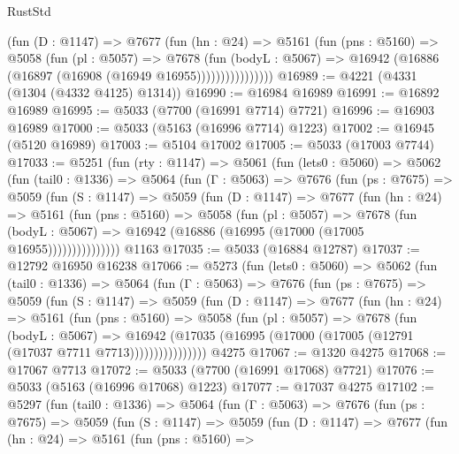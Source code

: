 \begin{lexlean}{RustStd}
\begin{coremodule}
                  (fun (D : @1147) =>
                  @7677
                    (fun (hn : @24) =>
                    @5161
                      (fun (pns : @5160) =>
                      @5058
                        (fun (pl : @5057) =>
                        @7678
                          (fun (bodyL : @5067) =>
                          @16942 (@16886 (@16897 (@16908 (@16949 @16955))))))))))))))))
@16989 := @4221 (@4331 (@1304 (@4332 @4125) @1314))
@16990 := @16984 @16989
@16991 := @16892 @16989
@16995 := @5033 (@7700 (@16991 @7714) @7721)
@16996 := @16903 @16989
@17000 := @5033 (@5163 (@16996 @7714) @1223)
@17002 := @16945 (@5120 @16989)
@17003 := @5104 @17002
@17005 := @5033 (@17003 @7744)
@17033 := @5251
    (fun (rty : @1147) =>
    @5061
      (fun (lets0 : @5060) =>
      @5062
        (fun (tail0 : @1336) =>
        @5064
          (fun (Γ : @5063) =>
          @7676
            (fun (ps : @7675) =>
            @5059
              (fun (S : @1147) =>
              @5059
                (fun (D : @1147) =>
                @7677
                  (fun (hn : @24) =>
                  @5161
                    (fun (pns : @5160) =>
                    @5058
                      (fun (pl : @5057) =>
                      @7678
                        (fun (bodyL : @5067) =>
                        @16942 (@16886 (@16995 (@17000 (@17005 @16955)))))))))))))))
    @1163
@17035 := @5033 (@16884 @12787)
@17037 := @12792 @16950 @16238
@17066 := @5273
    (fun (lets0 : @5060) =>
    @5062
      (fun (tail0 : @1336) =>
      @5064
        (fun (Γ : @5063) =>
        @7676
          (fun (ps : @7675) =>
          @5059
            (fun (S : @1147) =>
            @5059
              (fun (D : @1147) =>
              @7677
                (fun (hn : @24) =>
                @5161
                  (fun (pns : @5160) =>
                  @5058
                    (fun (pl : @5057) =>
                    @7678
                      (fun (bodyL : @5067) =>
                      @16942
                        (@17035 (@16995 (@17000 (@17005 (@12791 (@17037 @7711 @7713))))))))))))))))
    @4275
@17067 := @1320 @4275
@17068 := @17067 @7713
@17072 := @5033 (@7700 (@16991 @17068) @7721)
@17076 := @5033 (@5163 (@16996 @17068) @1223)
@17077 := @17037 @4275
@17102 := @5297
    (fun (tail0 : @1336) =>
    @5064
      (fun (Γ : @5063) =>
      @7676
        (fun (ps : @7675) =>
        @5059
          (fun (S : @1147) =>
          @5059
            (fun (D : @1147) =>
            @7677
              (fun (hn : @24) =>
              @5161
                (fun (pns : @5160) =>

\end{coremodule}
\end{lexlean}
